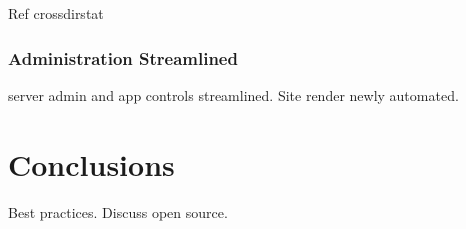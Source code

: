 \documentclass[10pt]{report}
\begin{document}
Ref crossdirstat

\subsection{Administration Streamlined}
server admin and app controls streamlined. Site render newly automated.




\chapter{Conclusions}

Best practices. Discuss open source.

\printbibliography{}
\end{document}
